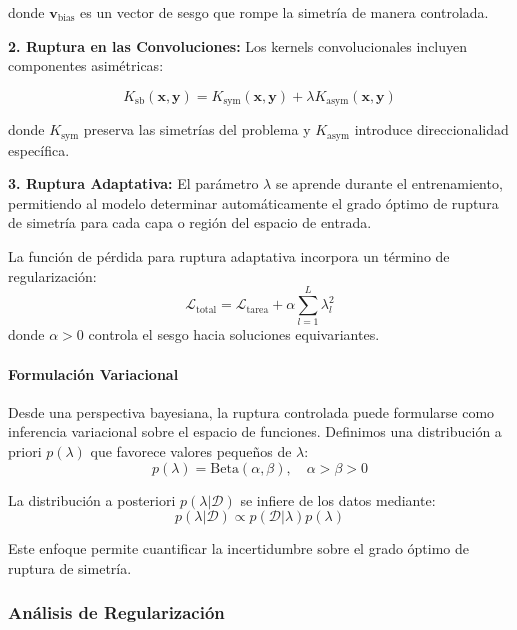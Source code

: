 donde $\mathbf{v}_{\text{bias}}$ es un vector de sesgo que rompe la simetría de manera controlada.

\textbf{2. Ruptura en las Convoluciones:} Los kernels convolucionales incluyen componentes asimétricas:

\begin{equation}
K_{\text{sb}}(\mathbf{x}, \mathbf{y}) = K_{\text{sym}}(\mathbf{x}, \mathbf{y}) + \lambda K_{\text{asym}}(\mathbf{x}, \mathbf{y})
\end{equation}

donde $K_{\text{sym}}$ preserva las simetrías del problema y $K_{\text{asym}}$ introduce direccionalidad específica.

\textbf{3. Ruptura Adaptativa:} El parámetro $\lambda$ se aprende durante el entrenamiento, permitiendo al modelo determinar automáticamente el grado óptimo de ruptura de simetría para cada capa o región del espacio de entrada.

La función de pérdida para ruptura adaptativa incorpora un término de regularización:
\begin{equation}
\mathcal{L}_{\text{total}} = \mathcal{L}_{\text{tarea}} + \alpha \sum_{l=1}^L \lambda_l^2
\end{equation}
donde $\alpha > 0$ controla el sesgo hacia soluciones equivariantes.

\paragraph{Formulación Variacional}

Desde una perspectiva bayesiana, la ruptura controlada puede formularse como inferencia variacional sobre el espacio de funciones. Definimos una distribución a priori $p(\lambda)$ que favorece valores pequeños de $\lambda$:
\begin{equation}
p(\lambda) = \text{Beta}(\alpha, \beta), \quad \alpha > \beta > 0
\end{equation}

La distribución a posteriori $p(\lambda | \mathcal{D})$ se infiere de los datos mediante:
\begin{equation}
p(\lambda | \mathcal{D}) \propto p(\mathcal{D} | \lambda) p(\lambda)
\end{equation}

Este enfoque permite cuantificar la incertidumbre sobre el grado óptimo de ruptura de simetría.

\subsubsection{Análisis de Regularización}

